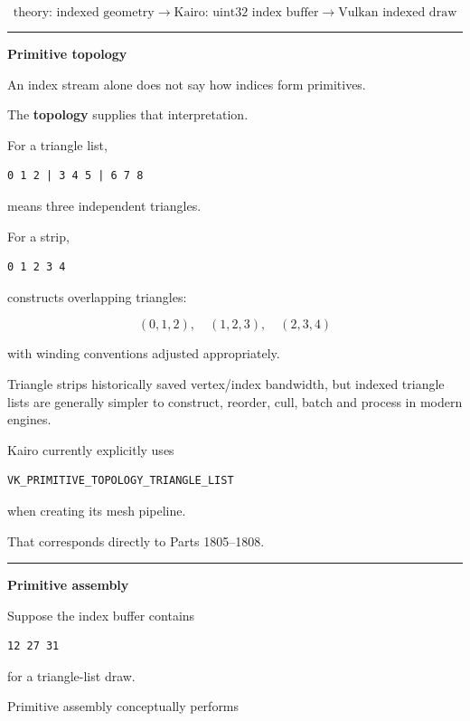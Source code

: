 \[
\boxed{\text{theory: indexed geometry}
\rightarrow
\text{Kairo: uint32 index buffer}
\rightarrow
\text{Vulkan indexed draw}}
\]

\begin{center}\rule{0.5\linewidth}{0.5pt}\end{center}

\textbf{Primitive topology}

An index stream alone does not say how indices form primitives.

The \textbf{topology} supplies that interpretation.

For a triangle list,

\begin{verbatim}
0 1 2 | 3 4 5 | 6 7 8
\end{verbatim}

means three independent triangles.

For a strip,

\begin{verbatim}
0 1 2 3 4
\end{verbatim}

constructs overlapping triangles:

\[
(0,1,2),\quad
(1,2,3),\quad
(2,3,4)
\]

with winding conventions adjusted appropriately.

Triangle strips historically saved vertex/index bandwidth, but indexed triangle lists are generally simpler to construct, reorder, cull, batch and process in modern engines.

Kairo currently explicitly uses

\begin{verbatim}
VK_PRIMITIVE_TOPOLOGY_TRIANGLE_LIST
\end{verbatim}

when creating its mesh pipeline.

That corresponds directly to Parts 1805--1808.

\begin{center}\rule{0.5\linewidth}{0.5pt}\end{center}

\textbf{Primitive assembly}

Suppose the index buffer contains

\begin{verbatim}
12 27 31
\end{verbatim}

for a triangle-list draw.

Primitive assembly conceptually performs

